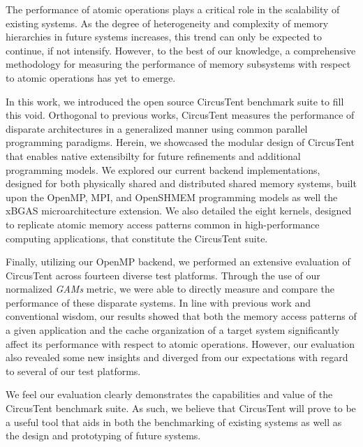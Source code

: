 
The performance of atomic operations plays a critical role in the scalability of existing systems.
As the degree of heterogeneity and complexity of memory hierarchies in future systems increases, this trend can only be expected to continue, if not intensify.
However, to the best of our knowledge, a comprehensive methodology for measuring the performance of memory subsystems with respect to atomic operations has yet to emerge.

In this work, we introduced the open source CircusTent benchmark suite to fill this void.
Orthogonal to previous works, CircusTent measures the performance of disparate architectures in a generalized manner using common parallel programming paradigms.
Herein, we showcased the modular design of CircusTent that enables native extensibilty for future refinements and additional programming models.
We explored our current backend implementations, designed for both physically shared and distributed shared memory systems, built upon the OpenMP, MPI, and OpenSHMEM programming models as well the xBGAS microarchitecture extension.
We also detailed the eight kernels, designed to replicate atomic memory access patterns common in high-performance computing applications, that constitute the CircusTent suite.

Finally, utilizing our OpenMP backend, we performed an extensive evaluation of CircusTent across fourteen diverse test platforms.
Through the use of our normalized \textit{GAMs} metric, we were able to directly measure and compare the performance of these disparate systems.
In line with previous work and conventional wisdom, our results showed that both the memory access patterns of a given application and the cache organization of a target system significantly affect its performance with respect to atomic operations.
However, our evaluation also revealed some new insights and diverged from our expectations with regard to several of our test platforms.

We feel our evaluation clearly demonstrates the capabilities and value of the CircusTent benchmark suite.
As such, we believe that CircusTent will prove to be a useful tool that aids in both the benchmarking of existing systems as well as the design and prototyping of future systems.